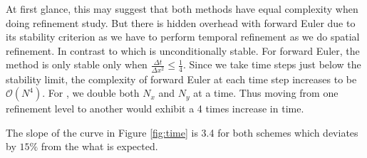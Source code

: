 At first glance, this may suggest that both methods have equal complexity when doing refinement study. But there is hidden overhead with forward Euler due to its stability criterion as we have to perform temporal refinement as we do spatial refinement. In contrast to \protect{\cn} which is unconditionally stable. For forward Euler, the method is only stable only when $\frac{\Delta t}{\Delta x^{2}} \leq \frac{1}{4}$. Since we take time steps just below the stability limit, the complexity of forward Euler at each time step increases to be $\mathcal{O}(N^{4})$. For \protect{\cn}, we double both $N_{x}$ and $N_{y}$ at a time. Thus moving from one refinement level to another would exhibit a 4 times increase in time. 

The slope of the curve in Figure \ref{fig:time} is 3.4 for both schemes which deviates by $15\%$ from the what is expected. 

